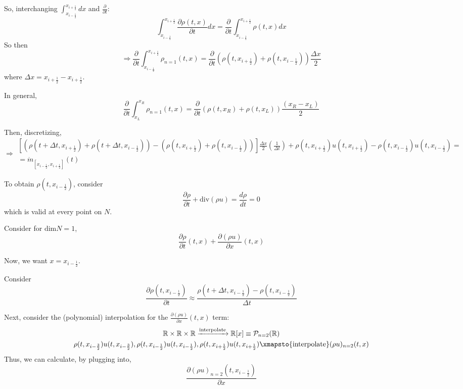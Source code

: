\documentclass[10pt]{amsart}
\begin{document}
\begin{multicols*}{2}
So, interchanging $\int_{x_{i -\frac{1}{2}}}^{x_{i +\frac{1}{2}}} dx$ and $\frac{ \partial }{ \partial t}$:
\[
\int_{x_{i -\frac{1}{2}}}^{x_{i +\frac{1}{2}}} \frac{ \partial \rho(t,x) }{ \partial t} dx = \frac{ \partial }{ \partial t} \int_{x_{i -\frac{1}{2}}}^{x_{i +\frac{1}{2}}} \rho(t,x)dx
\]
So then
\[
\Longrightarrow \frac{ \partial }{ \partial t} \int_{x_{i -\frac{1}{2}}}^{x_{i +\frac{1}{2}}} \rho_{n=1}(t,x) = \frac{ \partial }{ \partial t} ( \rho(t,x_{i+\frac{1}{2} }  )  + \rho(t,x_{i-\frac{1}{2} } ) ) \frac{ \Delta x}{2}
\]
where $\Delta x = x_{i+\frac{1}{2} } - x_{i+\frac{1}{2} } $.

In general,
\[
\frac{ \partial }{ \partial t} \int_{x_L}^{x_R} \rho_{n=1}(t,x) = \frac{ \partial }{ \partial t}( \rho(t,x_R) + \rho(t,x_L) ) \frac{ (x_R - x_L) }{2}
\]


Then, discretizing,
\begin{equation}
  \Longrightarrow \begin{gathered}
    \left[ (\rho(t+\Delta t, x_{i+\frac{1}{2} } ) + \rho(t+\Delta t, x_{i-\frac{1}{2} } ) ) - (\rho(t, x_{i+\frac{1}{2} } ) + \rho(t, x_{i-\frac{1}{2} } ) ) \right] \frac{\Delta x}{2} \left( \frac{1}{\Delta t} \right) + \rho(t,x_{i+\frac{1}{2} } )u(t,x_{i+\frac{1}{2} } ) - \rho(t,x_{i-\frac{1}{2} } )u(t,x_{i-\frac{1}{2} } ) = \\
    = \dot{m}_{[x_{i-\frac{1}{2} }, x_{i+\frac{1}{2} }] }(t)
  \end{gathered}
  \end{equation}

To obtain $\rho(t,x_{i-\frac{1}{2}})$, consider
\[
\frac{ \partial \rho}{ \partial t} + \text{div}(\rho u) = \frac{d\rho}{dt} = 0 
\]
which is valid at every point on $N$.

Consider for $\text{dim}N=1$,
\[
\frac{ \partial \rho}{ \partial t}(t,x) + \frac{ \partial (\rho u) }{ \partial x}(t,x)
\]

Now, we want $x = x_{i-\frac{1}{2} }$.

Consider
\[
\frac{ \partial \rho(t,x_{i-\frac{1}{2} }) }{ \partial t} \approx \frac{ \rho(t+\Delta t,x_{i-\frac{1}{2} })  - \rho(t,x_{i-\frac{1}{2} } ) }{\Delta t}
\]

Next, consider the (polynomial) interpolation for the $ \frac{ \partial (\rho u) }{ \partial x}(t,x)$ term:
\[
\begin{gathered}
  \mathbb{R} \times \mathbb{R}\times\mathbb{R} \xrightarrow{ \text{interpolate} } \mathbb{R}[x] \equiv \mathcal{P}_{n=2}(\mathbb{R}) \\ 
 \rho(t,x_{i-\frac{3}{2} } ) u(t,x_{i-\frac{3}{2} }) , \rho(t,x_{i-\frac{1}{2} })u(t,x_{i-\frac{1}{2} } ), \rho(t,x_{i+\frac{1}{2} })u(t,x_{i+\frac{1}{2} } ) \xmapsto{ \text{interpolate} } (\rho u)_{n=2}(t,x)
  \end{gathered}
\]
Thus, we can calculate, by plugging into,
\[
\frac{ \partial (\rho u)_{n=2}(t,x_{i-\frac{1}{2} } ) }{ \partial x}
\]


\end{multicols*}
\end{document}
